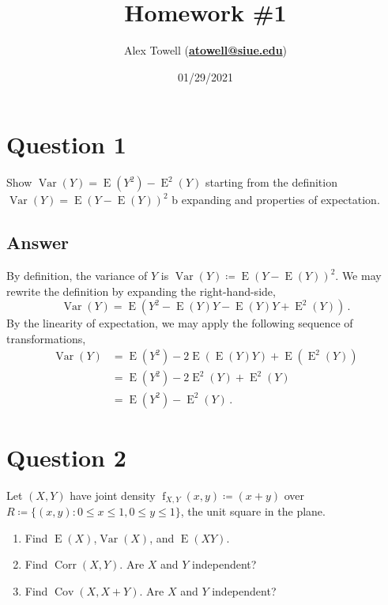 \documentclass[12pt]{fphw}
\title{Homework \#1} %
\author{Alex Towell (\href{mailto:atowell@siue.edu}{\bfseries{atowell@siue.edu}})}
\date{01/29/2021} %
\institute{Southern Illinois University-Edwardsville}
\newcommand{\var}{\operatorname{Var}}
\newcommand{\expect}{\operatorname{E}}
\newcommand{\corr}{\operatorname{Corr}}
\newcommand{\cov}{\operatorname{Cov}}
\begin{document}
\maketitle %

\section*{Question 1}

\begin{problem}
Show $\var(Y) = \expect(Y^2) - \expect^2(Y)$ starting from the definition $\var(Y) = \expect(Y-\expect(Y))^2$ b expanding and properties of expectation.
\end{problem}

\subsection*{Answer}
By definition, the variance of $Y$ is $\var(Y) \coloneqq \expect(Y-\expect(Y))^2$.
We may rewrite the definition by expanding the right-hand-side,
\begin{equation}
	\var(Y) = \expect(Y^2 - \expect(Y) Y - \expect(Y) Y + \expect^2(Y))\,.
\end{equation}
By the linearity of expectation, we may apply the following sequence of transformations,
\begin{align}
	\var(Y) &= \expect(Y^2) - 2 \expect(\expect(Y) Y) + \expect(\expect^2(Y))\\
		    &= \expect(Y^2) - 2 \expect^2(Y) + \expect^2(Y)\\
		    &= \expect(Y^2) - \expect^2(Y)\,.
\end{align}

\section*{Question 2}
\begin{problem}
Let $(X,Y)$ have joint density $\operatorname{f}_{X,Y}(x,y) \coloneqq (x+y)$ over $R \coloneqq \{(x,y) \colon 0 \leq x \leq 1, 0 \leq y \leq 1\}$, the unit square in the plane.
\medskip
\begin{enumerate}
\item Find $\expect(X)$,$\var(X)$, and $\expect(X Y)$.
\item Find $\corr(X,Y)$. Are $X$ and $Y$ independent?
\item Find $\cov(X,X+Y)$. Are $X$ and $Y$ independent?
\end{enumerate}
\end{problem}
	
\end{document}
